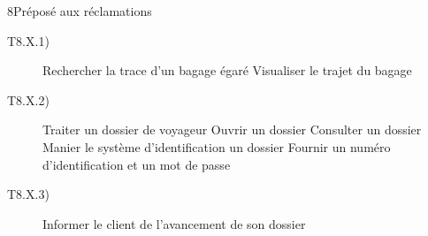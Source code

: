 \dta
{8}{Préposé aux réclamations}
{
\begin{description}
	\item [T8.X.1)] Rechercher la trace d'un bagage égaré
		\subitem [T8.X.1.2] Visualiser le trajet du bagage
	\item [T8.X.2)] Traiter un dossier de voyageur
		\subitem [T8.X.2.1)] Ouvrir un dossier
		\subitem [T8.X.2.1)] Consulter un dossier
		\subitem [T8.X.2.1)] Manier le système d'identification un dossier
			\subsubitem [T8.X.2.1)] Fournir un numéro d'identification et un mot de passe
	\item [T8.X.3)] Informer le client de l'avancement de son dossier
\end{description}
}
